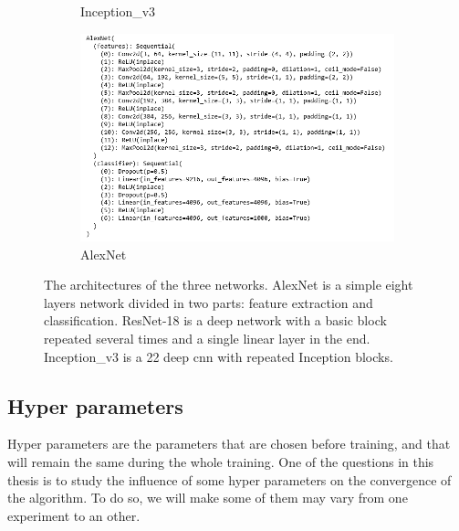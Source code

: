 \begin{figure}
\begin{subfigure}{.5\textwidth}
  \caption{Inception\_v3}
  \label{fig:googarch}
\end{subfigure}
\begin{subfigure}{.5\textwidth}
  \centering
  \includegraphics[width=1\linewidth]{figures/03-alexnet_architecture}
  \caption{AlexNet}
  \label{fig:alexarchi}
\end{subfigure}
\caption[Networks architectures]{The architectures of the three networks. AlexNet is a simple eight layers network divided in two parts: feature extraction and classification. ResNet-18 is a deep network with a basic block repeated several times and a single linear layer in the end. Inception\_v3 is a 22 deep \gls{cnn} with repeated Inception blocks.}
\end{figure}


\subsection{Hyper parameters}
Hyper parameters are the parameters that are chosen before training, and that will remain the same during the whole training. One of the questions in this thesis is to study the influence of some hyper parameters on the  convergence of the algorithm. To do so, we will make some of them may vary from one experiment to an other. 


